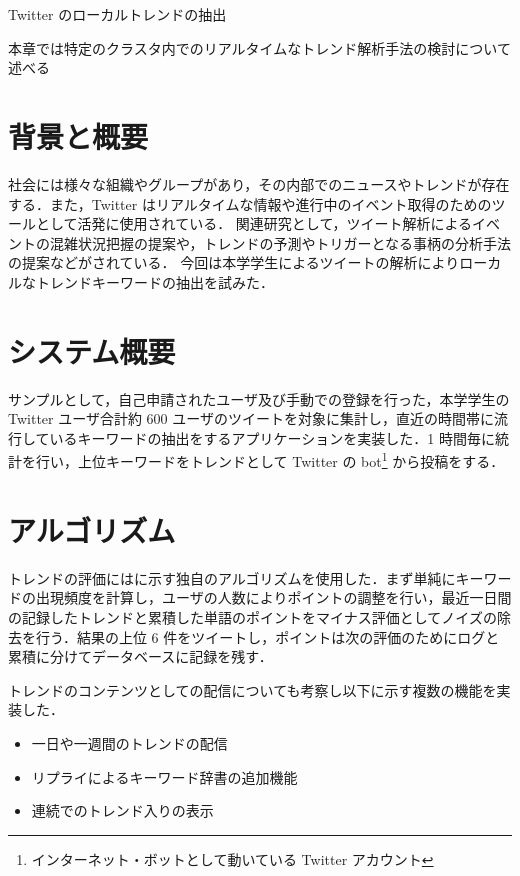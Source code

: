 \chapterhead
{Twitter のローカルトレンドの抽出}

{本章では特定のクラスタ内でのリアルタイムなトレンド解析手法の検討について述べる}


\section{背景と概要}
社会には様々な組織やグループがあり，その内部でのニュースやトレンドが存在する．また，Twitter はリアルタイムな情報や進行中のイベント取得のためのツールとして活発に使用されている．
関連研究として，ツイート解析によるイベントの混雑状況把握の提案\cite{socialevent}や，トレンドの予測やトリガーとなる事柄の分析手法の提案\cite{trendtrigger}などがされている．
今回は本学学生によるツイートの解析によりローカルなトレンドキーワードの抽出を試みた．

\section{システム概要}
サンプルとして，自己申請されたユーザ及び手動での登録を行った，本学学生の Twitter ユーザ合計約 600 ユーザのツイートを対象に集計し，直近の時間帯に流行しているキーワードの抽出をするアプリケーションを実装した．1 時間毎に統計を行い，上位キーワードをトレンドとして Twitter の bot\footnote{インターネット・ボットとして動いている Twitter アカウント} から投稿をする\cite{tdu_trend}．


\section{アルゴリズム}
トレンドの評価にはに示す独自のアルゴリズムを使用した．まず単純にキーワードの出現頻度を計算し，ユーザの人数によりポイントの調整を行い，最近一日間の記録したトレンドと累積した単語のポイントをマイナス評価としてノイズの除去を行う．結果の上位 6 件をツイートし，ポイントは次の評価のためにログと累積に分けてデータベースに記録を残す．


トレンドのコンテンツとしての配信についても考察し以下に示す複数の機能を実装した．
\begin{itemize}
    \item 一日や一週間のトレンドの配信
    \item リプライによるキーワード辞書の追加機能
    \item 連続でのトレンド入りの表示
\end{itemize}

